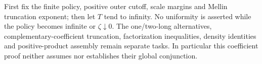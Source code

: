 First fix the finite policy, positive outer cutoff, scale margins and
Mellin truncation exponent; then let $T$ tend to infinity. No uniformity
is asserted while the policy becomes infinite or $\zeta\downarrow0$.
The one/two-long alternatives, complementary-coefficient truncation,
factorization inequalities, density identities and positive-product
assembly remain separate tasks. In particular this coefficient proof
neither assumes nor establishes their global conjunction.
